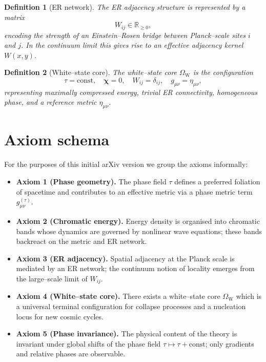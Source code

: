 \documentclass[11pt]{book}
\newtheorem{definition}{Definition}[chapter]
\newcommand{\Wcore}{\Omega_{\mathrm{W}}}
\begin{document}
\begin{definition}[ER network]
The ER adjacency structure is represented by a matrix
\[
  W_{ij} \in \mathbb{R}_{\ge 0},
\]
encoding the strength of an Einstein--Rosen bridge between Planck--scale sites $i$ and $j$.
In the continuum limit this gives rise to an effective adjacency kernel $W(x,y)$.
\end{definition}

\begin{definition}[White--state core]
The white--state core $\Wcore$ is the configuration
\[
  \tau = \text{const}, \quad \bm{\chi}=0, \quad W_{ij} = \delta_{ij}, \quad g_{\mu\nu} = \eta_{\mu\nu},
\]
representing maximally compressed energy, trivial ER connectivity, homogeneous phase, and a reference metric $\eta_{\mu\nu}$.
\end{definition}

\section{Axiom schema}

For the purposes of this initial arXiv version we group the axioms informally:

\begin{itemize}
  \item \textbf{Axiom 1 (Phase geometry).} The phase field $\tau$ defines a preferred foliation of spacetime and contributes to an effective metric via a phase metric term $g^{(\tau)}_{\mu\nu}$.
  \item \textbf{Axiom 2 (Chromatic energy).} Energy density is organised into chromatic bands whose dynamics are governed by nonlinear wave equations; these bands backreact on the metric and ER network.
  \item \textbf{Axiom 3 (ER adjacency).} Spatial adjacency at the Planck scale is mediated by an ER network; the continuum notion of locality emerges from the large--scale limit of $W_{ij}$.
  \item \textbf{Axiom 4 (White--state core).} There exists a white--state core $\Wcore$ which is a universal terminal configuration for collapse processes and a nucleation locus for new cosmic cycles.
  \item \textbf{Axiom 5 (Phase invariance).} The physical content of the theory is invariant under global shifts of the phase field $\tau \mapsto \tau + \text{const}$; only gradients and relative phases are observable.
\end{itemize}
\end{document}
